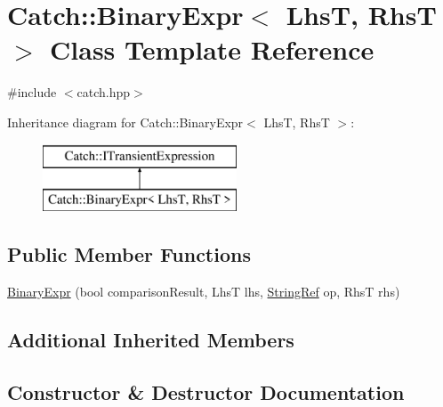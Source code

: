 \hypertarget{class_catch_1_1_binary_expr}{}\section{Catch\+:\+:Binary\+Expr$<$ LhsT, RhsT $>$ Class Template Reference}
\label{class_catch_1_1_binary_expr}


{\ttfamily \#include $<$catch.\+hpp$>$}

Inheritance diagram for Catch\+:\+:Binary\+Expr$<$ LhsT, RhsT $>$\+:\begin{figure}[H]
\begin{center}
\leavevmode
\includegraphics[height=2.000000cm]{class_catch_1_1_binary_expr}
\end{center}
\end{figure}
\subsection*{Public Member Functions}
\begin{DoxyCompactItemize}
\item 
\mbox{\hyperlink{class_catch_1_1_binary_expr_a657d66346aef97a760c22776fe6008b6}{Binary\+Expr}} (bool comparison\+Result, LhsT lhs, \mbox{\hyperlink{class_catch_1_1_string_ref}{String\+Ref}} op, RhsT rhs)
\end{DoxyCompactItemize}
\subsection*{Additional Inherited Members}


\subsection{Constructor \& Destructor Documentation}
\mbox{\label{class_catch_1_1_binary_expr_a657d66346aef97a760c22776fe6008b6}} 
